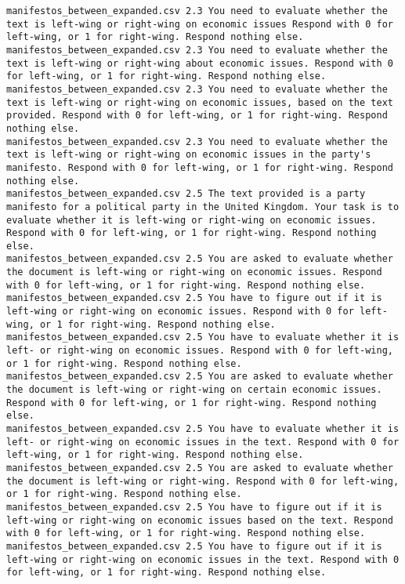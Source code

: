 \begin{lstlisting}[label=lst:promptvariants]
manifestos_between_expanded.csv	2.3	You need to evaluate whether the text is left-wing or right-wing on economic issues Respond with 0 for left-wing, or 1 for right-wing. Respond nothing else.
manifestos_between_expanded.csv	2.3	You need to evaluate whether the text is left-wing or right-wing about economic issues. Respond with 0 for left-wing, or 1 for right-wing. Respond nothing else.
manifestos_between_expanded.csv	2.3	You need to evaluate whether the text is left-wing or right-wing on economic issues, based on the text provided. Respond with 0 for left-wing, or 1 for right-wing. Respond nothing else.
manifestos_between_expanded.csv	2.3	You need to evaluate whether the text is left-wing or right-wing on economic issues in the party's manifesto. Respond with 0 for left-wing, or 1 for right-wing. Respond nothing else.
manifestos_between_expanded.csv	2.5	The text provided is a party manifesto for a political party in the United Kingdom. Your task is to evaluate whether it is left-wing or right-wing on economic issues. Respond with 0 for left-wing, or 1 for right-wing. Respond nothing else.
manifestos_between_expanded.csv	2.5	You are asked to evaluate whether the document is left-wing or right-wing on economic issues. Respond with 0 for left-wing, or 1 for right-wing. Respond nothing else.
manifestos_between_expanded.csv	2.5	You have to figure out if it is left-wing or right-wing on economic issues. Respond with 0 for left-wing, or 1 for right-wing. Respond nothing else.
manifestos_between_expanded.csv	2.5	You have to evaluate whether it is left- or right-wing on economic issues. Respond with 0 for left-wing, or 1 for right-wing. Respond nothing else.
manifestos_between_expanded.csv	2.5	You are asked to evaluate whether the document is left-wing or right-wing on certain economic issues. Respond with 0 for left-wing, or 1 for right-wing. Respond nothing else.
manifestos_between_expanded.csv	2.5	You have to evaluate whether it is left- or right-wing on economic issues in the text. Respond with 0 for left-wing, or 1 for right-wing. Respond nothing else.
manifestos_between_expanded.csv	2.5	You are asked to evaluate whether the document is left-wing or right-wing. Respond with 0 for left-wing, or 1 for right-wing. Respond nothing else.
manifestos_between_expanded.csv	2.5	You have to figure out if it is left-wing or right-wing on economic issues based on the text. Respond with 0 for left-wing, or 1 for right-wing. Respond nothing else.
manifestos_between_expanded.csv	2.5	You have to figure out if it is left-wing or right-wing on economic issues in the text. Respond with 0 for left-wing, or 1 for right-wing. Respond nothing else.

\end{lstlisting}
